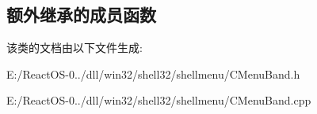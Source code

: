 \subsection*{额外继承的成员函数}


该类的文档由以下文件生成\+:\begin{DoxyCompactItemize}
\item 
E\+:/\+React\+O\+S-\/0../dll/win32/shell32/shellmenu/C\+Menu\+Band.\+h\item 
E\+:/\+React\+O\+S-\/0../dll/win32/shell32/shellmenu/C\+Menu\+Band.\+cpp\end{DoxyCompactItemize}
